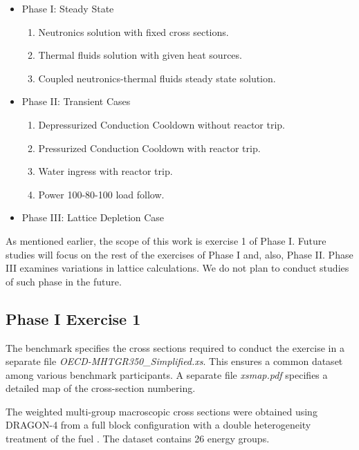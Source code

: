 \documentclass{anstrans}
\begin{document}
\begin{itemize}
	\item Phase I: Steady State
        \begin{enumerate}
            \item Neutronics solution with fixed cross sections. 
            \item Thermal fluids solution with given heat sources.
            \item Coupled neutronics-thermal fluids steady state solution.
        \end{enumerate}

        \item Phase II: Transient Cases
        \begin{enumerate}
            \item Depressurized Conduction Cooldown without reactor trip.
            \item Pressurized Conduction Cooldown with reactor trip.
            \item Water ingress with reactor trip.
            \item Power 100-80-100 load follow.
        \end{enumerate}

        \item Phase III: Lattice Depletion Case

\end{itemize}

As mentioned earlier, the scope of this work is exercise 1 of Phase I.
Future studies will focus on the rest of the exercises of Phase I and, also, Phase II.
Phase III examines variations in lattice calculations.
We do not plan to conduct studies of such phase in the future.

\subsection{Phase I Exercise 1} %

The benchmark specifies the cross sections required to conduct the exercise in a separate file \textit{OECD-MHTGR350_Simplified.xs}.
This ensures a common dataset among various benchmark participants.
A separate file \textit{xsmap.pdf} specifies a detailed map of the cross-section numbering.

The weighted multi-group macroscopic cross sections were obtained using DRAGON-4 \cite{marleau_user_2016} from a full block configuration with a double heterogeneity treatment of the fuel \cite{oecd_nea_benchmark_2017}.
The dataset contains 26 energy groups.
\end{document}
